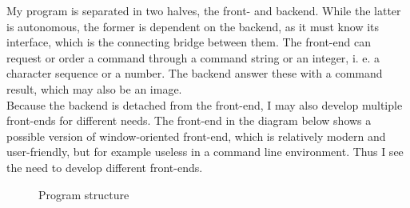 \documentclass[10pt,a4paper,titlepage]{article}
\begin{document}
	My program is separated in two halves, the front- and backend. While the latter is autonomous, the former is dependent on the backend, as it must know its interface, which is the connecting bridge between them. The front-end can request or order a command through a command string or an integer, i. e. a character sequence or a number. The backend answer these with a command result, which may also be an image.\\
	Because the backend is detached from the front-end, I may also develop multiple front-ends for different needs. The front-end in the diagram below shows a possible version of window-oriented front-end, which is relatively modern and user-friendly, but for example useless in a command line environment. Thus I see the need to develop different front-ends.
	
		\begin{figure}
			\centering
			\caption{Program structure}
\end{figure}
\end{document}
